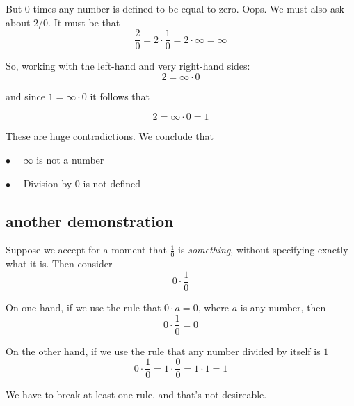 \documentclass[11pt, oneside]{article}
\begin{document}
But $0$ times any number is defined to be equal to zero.  Oops.  We must also ask about $2/0$.  It must be that
\[ \frac{2}{0} = 2 \cdot \frac{1}{0} = 2 \cdot \infty =  \infty \]

So, working with the left-hand and very right-hand sides:
\[ 2 = \infty \cdot 0 \]

and since $1 = \infty \cdot 0$ it follows that

\[ 2 = \infty \cdot 0 = 1 \]

These are huge contradictions.  We conclude that

$\bullet$ \ \ $\infty$ is not a number

$\bullet$ \ \ Division by $0$ is not defined

\subsection*{another demonstration}
Suppose we accept for a moment that $\frac{1}{0}$ is \emph{something}, without specifying exactly what it is.  Then consider
\[ 0 \cdot \frac{1}{0} \]

On one hand, if we use the rule that $0 \cdot a = 0$, where $a$ is any number, then
\[ 0 \cdot \frac{1}{0} = 0 \]

On the other hand, if we use the rule that any number divided by itself is $1$
\[ 0 \cdot \frac{1}{0} = 1 \cdot \frac{0}{0} = 1 \cdot 1 = 1  \]

We have to break at least one rule, and that's not desireable.
\end{document}
